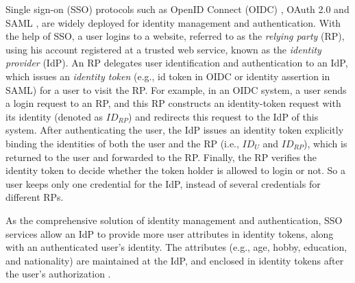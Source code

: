 Single sign-on (SSO) protocols such as OpenID Connect (OIDC) \cite{OpenIDConnect}, OAuth 2.0 \cite{rfc6749} and SAML \cite{SAML,SAMLIdentifier},
 are widely deployed for identity management and authentication.
 With the help of SSO,
  a user logins to a website, referred to as the \emph{relying party} (RP), using his account registered at a trusted web service,
   known as the \emph{identity provider} (IdP).
An RP delegates user identification and authentication to an IdP,
    which issues an \emph{identity token} (e.g., id token in OIDC or identity assertion in SAML) for a user to visit the RP. %
%
%
For example, in an OIDC system,
     a user sends a login request to an RP,
and this RP constructs an identity-token request with its identity (denoted as $ID_{RP}$) and redirects this request to the IdP of this system.
After authenticating the user,
 the IdP issues an identity token explicitly binding the identities of both the user and the RP (i.e., $ID_U$ and $ID_{RP}$),
    which is returned to the user and forwarded to the RP.
Finally, the RP verifies the identity token to decide whether the token holder is allowed to login or not.
So a user keeps only one credential for the IdP, instead of several credentials for different RPs.

As the comprehensive solution of identity management and authentication,
    SSO services allow an IdP to provide more user attributes in identity tokens,
        along with an authenticated user's identity.
The attributes (e.g., age, hobby, education, and nationality) are maintained at the IdP,
    and enclosed in identity tokens after the user's authorization \cite{OpenIDConnect,rfc6749}.

